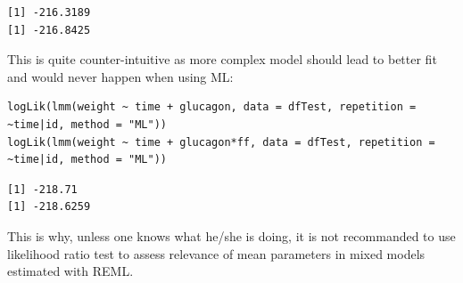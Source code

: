 \documentclass[12pt]{article}
\begin{document}
\begin{verbatim}
[1] -216.3189
[1] -216.8425
\end{verbatim}


This is quite counter-intuitive as more complex model should lead to
better fit and would never happen when using ML:
\lstset{language=r,label= ,caption= ,captionpos=b,numbers=none}
\begin{lstlisting}
logLik(lmm(weight ~ time + glucagon, data = dfTest, repetition = ~time|id, method = "ML"))
logLik(lmm(weight ~ time + glucagon*ff, data = dfTest, repetition = ~time|id, method = "ML"))
\end{lstlisting}

\begin{verbatim}
[1] -218.71
[1] -218.6259
\end{verbatim}


This is why, unless one knows what he/she is doing, it is not
recommanded to use likelihood ratio test to assess relevance of mean
parameters in mixed models estimated with REML.

\clearpage
\end{document}
